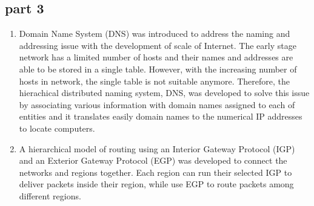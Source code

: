 \subsection{part 3}

\begin{enumerate}
\item Domain Name System (DNS) was introduced to address the naming and addressing issue with the development of scale of Internet. The early stage network has a limited number of hosts and their names and addresses are able to be stored in a single table. However, with the increasing number of hosts in network, the single table is not suitable anymore. Therefore, the hierachical distributed naming system, DNS, was developed to solve this issue by associating various information with domain names assigned to each of entities and it translates easily domain names to the numerical IP addresses to locate computers.
\item A hierarchical model of routing using an Interior Gateway Protocol (IGP) and an Exterior Gateway Protocol (EGP) was developed to connect the networks and regions together. Each region can run their selected IGP to deliver packets inside their region, while use EGP to route packets among different regions.
\end{enumerate}










